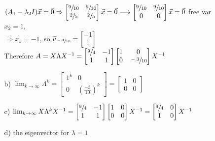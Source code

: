 \documentclass[12pt]{article}
\begin{document}
\begin{itemize}
\begin{itemize}
            $(A_1-\lambda_2 I)\vec{x}=\vec{0}\Rightarrow
            \begin{bmatrix}
            \sfrac{9}{10} & \sfrac{9}{10} \\ \sfrac{2}{5} & \sfrac{2}{5}
            \end{bmatrix}\vec{x}=\vec{0}\longrightarrow
            \begin{bmatrix}
            \sfrac{9}{10} & \sfrac{9}{10} \\ 0 & 0
            \end{bmatrix}\vec{x}=\vec{0}$ free var $x_2=1$, \\
            $\Rightarrow x_1=-1$, so $\vec{v}_{\sfrac{-3}{10}}=\begin{bmatrix} -1 \\ 1\end{bmatrix}$ \\
            Therefore 
            $A=X \Lambda X^{-1}=
            \begin{bmatrix}
            \sfrac{9}{4} & -1 \\ 1 & 1
            \end{bmatrix}
            \begin{bmatrix}
            1 & 0 \\ 0 & \sfrac{-3}{10}
            \end{bmatrix} X^{-1}$
\item[b)] $\lim_{k\rightarrow\infty}\Lambda^k=
			\begin{bmatrix}
			1^k & 0 \\ 0 & (\frac{-3}{10})^k
			\end{bmatrix}=
            \begin{bmatrix}
            1 & 0 \\ 0 & 0
            \end{bmatrix}$
\item[c)] $\lim_{k\rightarrow\infty}X\Lambda^k X^{-1}=
 			\begin{bmatrix}
            \sfrac{9}{4} & -1 \\ 1 & 1
            \end{bmatrix}
            \begin{bmatrix}
            1 & 0 \\ 0 & 0
            \end{bmatrix}X^{-1}=
            \begin{bmatrix}
            \sfrac{9}{4} & 0 \\ 1 & 0
            \end{bmatrix}X^{-1}$
\item[d)] the eigenvector for $\lambda=1$
\end{itemize}

\end{itemize}
\end{document}
